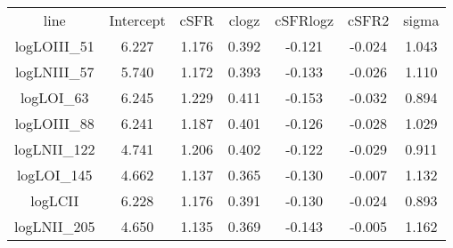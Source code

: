 \begin{table}
\begin{tabular}{ccccccc}
line & Intercept & cSFR & clogz & cSFRlogz & cSFR2 & sigma \\
logLOIII_51 & 6.227 & 1.176 & 0.392 & -0.121 & -0.024 & 1.043 \\
logLNIII_57 & 5.740 & 1.172 & 0.393 & -0.133 & -0.026 & 1.110 \\
logLOI_63 & 6.245 & 1.229 & 0.411 & -0.153 & -0.032 & 0.894 \\
logLOIII_88 & 6.241 & 1.187 & 0.401 & -0.126 & -0.028 & 1.029 \\
logLNII_122 & 4.741 & 1.206 & 0.402 & -0.122 & -0.029 & 0.911 \\
logLOI_145 & 4.662 & 1.137 & 0.365 & -0.130 & -0.007 & 1.132 \\
logLCII & 6.228 & 1.176 & 0.391 & -0.130 & -0.024 & 0.893 \\
logLNII_205 & 4.650 & 1.135 & 0.369 & -0.143 & -0.005 & 1.162 \\
\end{tabular}
\end{table}
